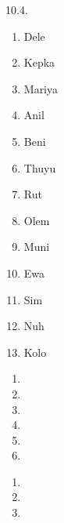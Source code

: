 \begin{refsection}
\begin{practiceproblemsolution}{10.4. \langnameKharia}
\begin{solutions}[label=Solution 10.4\alph*]
    \item
    \begin{multicols}{3}
        \begin{enumerate}[label = \alph*.]
            \item Dele
            \item Kepka
            \item Mariya
            \item Anil
            \item Beni
            \item Thuyu
            \item Rut
            \item Olem
            \item Muni
            \item Ewa
            \item Sim
            \item Nuh
            \item Kolo
        \end{enumerate}
    \end{multicols}
    \item
    \begin{multicols}{2}
        \begin{enumerate}
            \item {}
            \item {}
            \item {}
            \item {}
            \item {}
            \item[]
        \end{enumerate}
    \end{multicols}
    \item
        \begin{multicols}{3}
        \begin{enumerate}[start = 6]
            \item {}
            \item {}
            \item {}
        \end{enumerate}
    \end{multicols}
\end{solutions}


\end{practiceproblemsolution}
\end{refsection}
